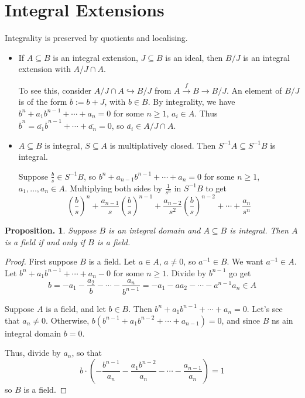 \documentclass[11pt, a4paper]{memoir}
\newcommand{\fto}[1]{\ensuremath{\xrightarrow{\scriptstyle{#1}}}}
\theoremstyle{change}
\newtheorem{proposition}[theorem]{Proposition.}
\theoremstyle{plain}
\theoremstyle{nonumberplain}
\newtheorem{proof}{Proof}
\numberwithin{equation}{section}
\begin{document}
\section{Integral Extensions}
Integrality is preserved by quotients and localising.
\begin{itemize}[nl]
    \item If $A\subseteq B$ is an integral extension, $J\subseteq B$ is an ideal, then $B/J$ is an integral extension with $A/J\cap A$.

        To see this, consider $A/J\cap A\hookrightarrow B/J$ from $A\fto{f} B\to B/J$.
        An element of $B/J$ is of the form $\overline{b}:= b+J$, with $b\in B$.
        By integrality, we have $b^n+a_1b^{n-1}+\cdots+a_n=0$ for some $n\geq 1$, $a_i\in A$.
        Thus $\overline{b}^n=\overline{a_1}\overline{b}^{n-1}+\cdots+\overline{a_n}=0$, so $\overline{a_i}\in A/J\cap A$.
    \item $A\subseteq B$ is integral, $S\subseteq A$ is multiplatively closed.
        Then $S^{-1}A\subseteq S^{-1}B$ is integral.

        Suppose $\frac{b}{s}\in S^{-1}B$, so $b^n+a_{n-1}b^{n-1}+\cdots+a_n=0$ for some $n\geq 1$, $a_1,\ldots,a_n\in A$.
        Multiplying both sides by $\frac{1}{s^n}$ in $S^{-1}B$ to get
        \begin{equation*}
            \left(\frac{b}{s}\right)^n+\frac{a_{n-1}}{s}\left(\frac{b}{s}\right)^{n-1}+\frac{a_{n-2}}{s^2}\left(\frac{b}{s}\right)^{n-2}+\cdots+\frac{a_n}{s^n}
        \end{equation*}
\end{itemize}
\begin{proposition}
    Suppose $B$ is an integral domain and $A\subseteq B$ is integral.
    Then $A$ is a field if and only if $B$ is a field.
\end{proposition}
\begin{proof}
    First suppose $B$ is a field.
    Let $a\in A$, $a\neq 0$, so $a^{-1}\in B$.
    We want $a^{-1}\in A$.
    Let $b^n+a_1b^{n-1}+\cdots+a_n-0$ for some $n\geq 1$.
    Divide by $b^{n-1}$ go get
    \begin{equation*}
        b=-a_1-\frac{a_2}{b}-\cdots-\frac{a_n}{b^{n-1}}=-a_1-aa_2-\cdots-a^{n-1}a_n\in A
    \end{equation*}

    Suppose $A$ is a field, and let $b\in B$.
    Then $b^n+a_1b^{n-1}+\cdots+a_n=0$.
    Let's see that $a_n\neq 0$.
    Otherwise, $b(b^{n-1}+a_1b^{n-2}+\cdots+a_{n-1})=0$, and since $B$ ns ain integral domain $b=0$.

    Thus, divide by $a_n$, so that
    \begin{equation*}
        b\cdot\left(-\frac{b^{n-1}}{a_n}-\frac{a_1b^{n-2}}{a_n}-\cdots-\frac{a_{n-1}}{a_n}\right)=1
    \end{equation*}
    so $B$ is a field.
\end{proof}
\end{document}
